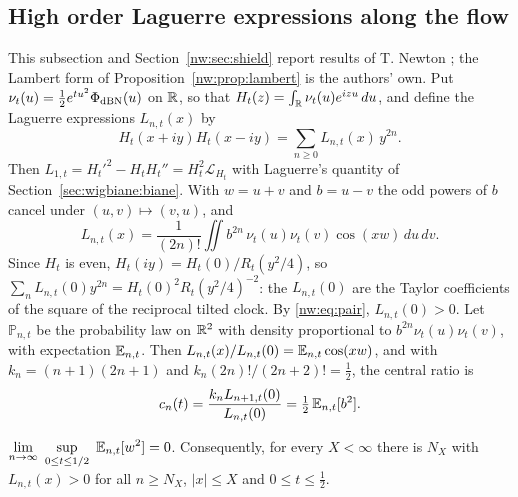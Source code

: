 \subsection{High order Laguerre expressions along the flow}\label{nw:sec:lag}

This subsection and Section~\ref{nw:sec:shield} report results of T. Newton \cite{Newton26}; the Lambert form of Proposition~\ref{nw:prop:lambert} is the authors' own. Put $\nu_t(u)=\frac12e^{tu^2}\Phi_{\rm dBN}(u)$ on $\mathbb{R}$, so that $H_t(z)=\int_{\mathbb{R}}\nu_t(u)e^{izu}\,du$, and define the Laguerre expressions $L_{n,t}(x)$ by
\[
H_t(x+iy)H_t(x-iy)=\sum_{n\ge0}L_{n,t}(x)\,y^{2n}.
\]
Then $L_{1,t}=H_t'^2-H_tH_t''=H_t^2\mathcal L_{H_t}$ with Laguerre's quantity of Section~\ref{sec:wigbiane:biane}. With $w=u+v$ and $b=u-v$ the odd powers of $b$ cancel under $(u,v)\mapsto(v,u)$, and
\begin{equation}\label{nw:eq:pair}
L_{n,t}(x)=\frac1{(2n)!}\iint b^{2n}\,\nu_t(u)\nu_t(v)\cos(xw)\,du\,dv .
\end{equation}
Since $H_t$ is even, $H_t(iy)=H_t(0)/R_t(y^2/4)$, so $\sum_nL_{n,t}(0)y^{2n}=H_t(0)^2R_t(y^2/4)^{-2}$: the $L_{n,t}(0)$ are the Taylor coefficients of the square of the reciprocal tilted clock. By \eqref{nw:eq:pair}, $L_{n,t}(0)>0$. Let $\mathbb P_{n,t}$ be the probability law on $\mathbb{R}^2$ with density proportional to $b^{2n}\nu_t(u)\nu_t(v)$, with expectation $\mathbb{E}_{n,t}$. Then $L_{n,t}(x)/L_{n,t}(0)=\mathbb{E}_{n,t}\cos(xw)$, and with $k_n=(n+1)(2n+1)$ and $k_n(2n)!/(2n+2)!=\frac12$, the central ratio is
\[
c_n(t)=\frac{k_nL_{n+1,t}(0)}{L_{n,t}(0)}=\tfrac12\,\mathbb{E}_{n,t}[b^2].
\]

\begin{theorem}[Newton]\label{nw:thm:conc}
$\displaystyle\lim_{n\to\infty}\ \sup_{0\le t\le1/2}\ \mathbb{E}_{n,t}[w^2]=0$. Consequently, for every $X<\infty$ there is $N_X$ with $L_{n,t}(x)>0$ for all $n\ge N_X$, $|x|\le X$ and $0\le t\le\frac12$.
\end{theorem}


